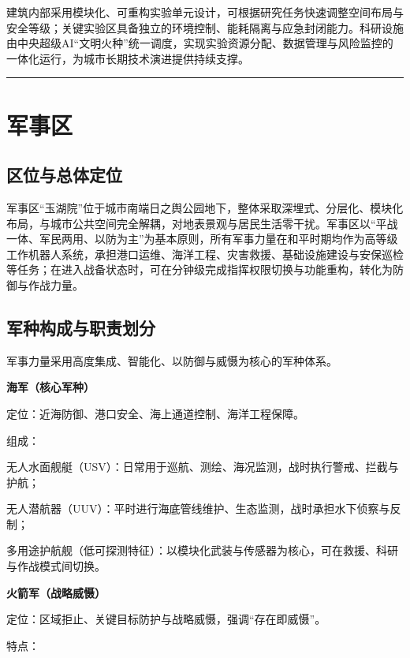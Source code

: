 建筑内部采用模块化、可重构实验单元设计，可根据研究任务快速调整空间布局与安全等级；关键实验区具备独立的环境控制、能耗隔离与应急封闭能力。科研设施由中央超级AI``文明火种''统一调度，实现实验资源分配、数据管理与风险监控的一体化运行，为城市长期技术演进提供持续支撑。

\begin{center}\rule{0.5\linewidth}{0.5pt}\end{center}

\section{军事区}\label{ux519bux4e8bux533a}

\subsection{区位与总体定位}\label{ux533aux4f4dux4e0eux603bux4f53ux5b9aux4f4d}

军事区``玉湖院''位于城市南端日之舆公园地下，整体采取深埋式、分层化、模块化布局，与城市公共空间完全解耦，对地表景观与居民生活零干扰。军事区以``平战一体、军民两用、以防为主''为基本原则，所有军事力量在和平时期均作为高等级工作机器人系统，承担港口运维、海洋工程、灾害救援、基础设施建设与安保巡检等任务；在进入战备状态时，可在分钟级完成指挥权限切换与功能重构，转化为防御与作战力量。

\subsection{军种构成与职责划分}\label{ux519bux79cdux6784ux6210ux4e0eux804cux8d23ux5212ux5206}

军事力量采用高度集成、智能化、以防御与威慑为核心的军种体系。

\textbf{海军（核心军种）}

定位：近海防御、港口安全、海上通道控制、海洋工程保障。

组成：

无人水面舰艇（USV）：日常用于巡航、测绘、海况监测，战时执行警戒、拦截与护航；

无人潜航器（UUV）：平时进行海底管线维护、生态监测，战时承担水下侦察与反制；

多用途护航舰（低可探测特征）：以模块化武装与传感器为核心，可在救援、科研与作战模式间切换。

\textbf{火箭军（战略威慑）}

定位：区域拒止、关键目标防护与战略威慑，强调``存在即威慑''。

特点：

